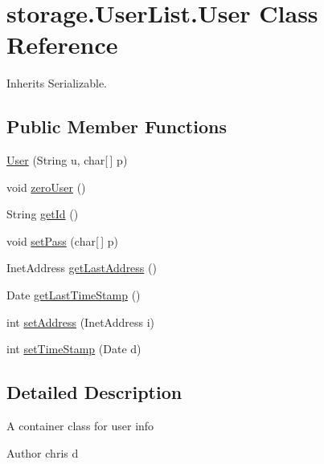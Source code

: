 \hypertarget{classstorage_1_1_user_list_1_1_user}{
\section{storage.\-User\-List.\-User \-Class \-Reference}
\label{classstorage_1_1_user_list_1_1_user}
}


\-Inherits \-Serializable.

\subsection*{\-Public \-Member \-Functions}
\begin{DoxyCompactItemize}
\item 
\hyperlink{classstorage_1_1_user_list_1_1_user_a2f0844b180844ecca8d249d861600693}{\-User} (\-String u, char\mbox{[}$\,$\mbox{]} p)
\item 
void \hyperlink{classstorage_1_1_user_list_1_1_user_a84ef66c1e61490c26cd4d763dfacac80}{zero\-User} ()
\item 
\-String \hyperlink{classstorage_1_1_user_list_1_1_user_ab54aa227c409f8542458aad21bf3738b}{get\-Id} ()
\item 
void \hyperlink{classstorage_1_1_user_list_1_1_user_af8d8762726d3f0690ce11ac85097d02c}{set\-Pass} (char\mbox{[}$\,$\mbox{]} p)
\item 
\-Inet\-Address \hyperlink{classstorage_1_1_user_list_1_1_user_aef8110b578af4b29f4d85991e7a40708}{get\-Last\-Address} ()
\item 
\-Date \hyperlink{classstorage_1_1_user_list_1_1_user_ab85357ba470ab1fa3fce38bc1b4ed117}{get\-Last\-Time\-Stamp} ()
\item 
int \hyperlink{classstorage_1_1_user_list_1_1_user_aa299f3be4d934fac6b6b5ba5eb637518}{set\-Address} (\-Inet\-Address i)
\item 
int \hyperlink{classstorage_1_1_user_list_1_1_user_a975d1f291743e6b812663a01eb2cd46f}{set\-Time\-Stamp} (\-Date d)
\end{DoxyCompactItemize}


\subsection{\-Detailed \-Description}
\-A container class for user info \begin{DoxyAuthor}{\-Author}
chris d 
\end{DoxyAuthor}


